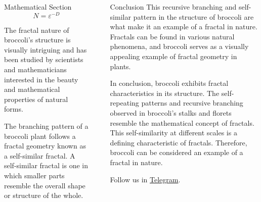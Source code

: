 \documentclass[]{beamer}
\begin{document}
\begin{frame}[t]
\begin{columns}[t]
\begin{column}{\onecolwid}
\begin{block}{Mathematical Section}
    $$
    N = \varepsilon^{-D}
    $$
    
    The fractal nature of broccoli's structure is visually intriguing and has been studied by scientists and mathematicians interested in the beauty and mathematical properties of natural forms. 
    
    The branching pattern of a broccoli plant follows a fractal geometry known as a self-similar fractal. A self-similar fractal is one in which smaller parts resemble the overall shape or structure of the whole.  
    \end{block}
   
    
    \end{column}
    
    
    \begin{column}{\sepwid}\end{column} %
    
    \begin{column}{\onecolwid} %
    
        
        \begin{block}{Conclusion}
        This recursive branching and self-similar pattern in the structure of broccoli are what make it an example of a fractal in nature. Fractals can be found in various natural phenomena, and broccoli serves as a visually appealing example of fractal geometry in plants.
    
        In conclusion, broccoli exhibits fractal characteristics in its structure. The self-repeating patterns and recursive branching observed in broccoli's stalks and florets resemble the mathematical concept of fractals. This self-similarity at different scales is a defining characteristic of fractals. Therefore, broccoli can be considered an example of a fractal in nature.
            
        Follow us in \href{https://t.me/vega_institute}{Telegram}.
        
        \end{block}
        
        

\end{column}
\end{columns}
\end{frame}
\end{document}
